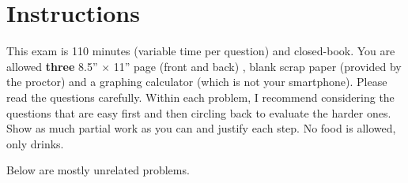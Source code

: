 \documentclass[12pt]{article}
\begin{document}
\section*{Instructions}
This exam is 110 minutes (variable time per question) and closed-book. You are allowed \textbf{three} 8.5'' $\times$ 11'' page (front and back) , blank scrap paper (provided by the proctor) and a graphing calculator (which is not your smartphone). Please read the questions carefully. Within each problem, I recommend considering the questions that are easy first and then circling back to evaluate the harder ones. Show as much partial work as you can and justify each step. No food is allowed, only drinks. %

\pagebreak


\problem Below are mostly unrelated problems.
\end{document}
